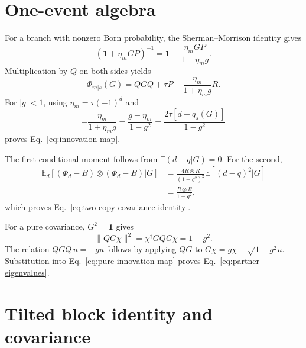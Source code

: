 \documentclass[
  aps,prx,twocolumn,superscriptaddress,longbibliography,
  nofootinbib,floatfix
]{revtex4-2}
\newcommand{\Id}{\mathbf{1}}
\newcommand{\E}{\mathbb{E}}
\theoremstyle{plain}
\theoremstyle{definition}
\begin{document}
\appendix

\section{One-event algebra}
\label{app:one-event-algebra}

For a branch with nonzero Born probability, the Sherman--Morrison identity
gives
\begin{equation}
 (\Id+\eta_mGP)^{-1}
 =\Id-\frac{\eta_mGP}{1+\eta_mg}.
 \label{eq:app-SM}
\end{equation}
Multiplication by \(Q\) on both sides yields
\begin{equation}
 \Phi_{m|s}(G)
 =QGQ+\tau P-\frac{\eta_m}{1+\eta_mg}R.
 \label{eq:app-branch-map}
\end{equation}
For \(|g|<1\), using \(\eta_m=\tau(-1)^d\) and
\begin{equation}
 -\frac{\eta_m}{1+\eta_mg}
 =\frac{g-\eta_m}{1-g^2}
 =\frac{2\tau[d-q_s(G)]}{1-g^2}
 \label{eq:app-innovation-coefficient}
\end{equation}
proves Eq.~\eqref{eq:innovation-map}.

The first conditional moment follows from \(\E(d-q|G)=0\).  For the second,
\begin{align}
 \E_d[(\Phi_d-B)\otimes(\Phi_d-B)|G]
 &=\frac{4R\otimes R}{(1-g^2)^2}\E[(d-q)^2|G]
 \nonumber\\
 &=\frac{R\otimes R}{1-g^2},
 \label{eq:app-second-moment-proof}
\end{align}
which proves Eq.~\eqref{eq:two-copy-covariance-identity}.

For a pure covariance, \(G^2=\Id\) gives
\begin{equation}
 \|QG\chi\|^2
 =\chi^\dagger GQG\chi=1-g^2.
 \label{eq:app-pure-norm}
\end{equation}
The relation \(QGQ\,u=-gu\) follows by applying \(QG\) to
\(G\chi=g\chi+\sqrt{1-g^2}u\).  Substitution into
Eq.~\eqref{eq:pure-innovation-map} proves
Eq.~\eqref{eq:partner-eigenvalues}.

\section{Tilted block identity and covariance}
\label{app:tilted-derivation}
\end{document}
